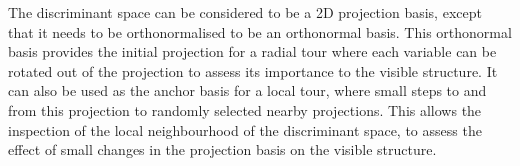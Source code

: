 \documentclass[
  letterpaper,
]{krantz}
\begin{document}
\begin{table}

\caption{\label{tbl-ds-coef-pdf}Coefficients of the discriminant space,
original and othonormalised. LD1 is the direction where Gentoo is
separated from the others, and the coefficients suggest this is due to a
contrast between bd and fl/bm. LD2 is where Adelie is different from
Chinstrap, which is generated by a contrast between bl and bm.}


\end{table}%

The discriminant space can be considered to be a 2D projection basis,
except that it needs to be orthonormalised to be an orthonormal basis.
This orthonormal basis provides the initial projection for a radial tour
where each variable can be rotated out of the projection to assess its
importance to the visible structure. It can also be used as the anchor
basis for a local tour, where small steps to and from this projection to
randomly selected nearby projections. This allows the inspection of the
local neighbourhood of the discriminant space, to assess the effect of
small changes in the projection basis on the visible structure.

 
\end{document}
